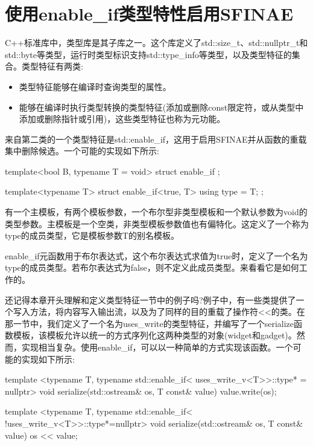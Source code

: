 \section{使用enable\_if类型特性启用SFINAE}
C++标准库中，类型库是其子库之一。这个库定义了std::size\_t、std::nullptr\_t和std::byte等类型，运行时类型标识支持std::type\_info等类型，以及类型特征的集合。类型特征有两类:

\begin{itemize}
\item
类型特征能够在编译时查询类型的属性。

\item
能够在编译时执行类型转换的类型特征(添加或删除const限定符，或从类型中添加或删除指针或引用)，这些类型特征也称为元功能。
\end{itemize}

来自第二类的一个类型特征是std::enable\_if，这用于启用SFINAE并从函数的重载集中删除候选。一个可能的实现如下所示:

\begin{cpp}
template<bool B, typename T = void>
struct enable_if {};

template<typename T>
struct enable_if<true, T> { using type = T; };
\end{cpp}

有一个主模板，有两个模板参数，一个布尔型非类型模板和一个默认参数为void的类型参数。主模板是一个空类，非类型模板参数值也有偏特化。这定义了一个称为type的成员类型，它是模板参数T的别名模板。

enable\_if元函数用于布尔表达式，这个布尔表达式求值为true时，定义了一个名为type的成员类型。若布尔表达式为false，则不定义此成员类型。来看看它是如何工作的。

还记得本章开头理解和定义类型特征一节中的例子吗?例子中，有一些类提供了一个写入方法，将内容写入输出流，以及为了同样的目的重载了操作符<{}<的类。在那一节中，我们定义了一个名为uses\_write的类型特征，并编写了一个serialize函数模板，该模板允许以统一的方式序列化这两种类型的对象(widget和gadget)。然而，实现相当复杂。使用enable\_if，可以以一种简单的方式实现该函数。一个可能的实现如下所示:

\begin{cpp}
template <typename T,
		  typename std::enable_if<
			uses_write_v<T>>::type* = nullptr>
void serialize(std::ostream& os, T const& value)
{
	value.write(os);
}

template <typename T,
		  typename std::enable_if<
			!uses_write_v<T>>::type*=nullptr>
void serialize(std::ostream& os, T const& value)
{
	os << value;
}
\end{cpp}

